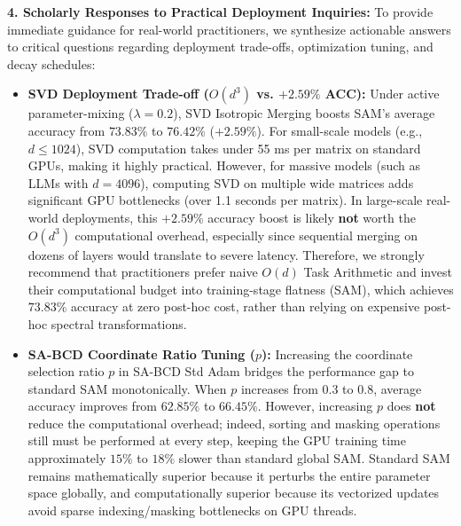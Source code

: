 \documentclass{article}
\theoremstyle{plain}
\theoremstyle{definition}
\theoremstyle{remark}
\begin{document}
\textbf{4. Scholarly Responses to Practical Deployment Inquiries:}
To provide immediate guidance for real-world practitioners, we synthesize actionable answers to critical questions regarding deployment trade-offs, optimization tuning, and decay schedules:
\begin{itemize}
  \item \textbf{SVD Deployment Trade-off ($O(d^3)$ vs. $+2.59\%$ ACC):} Under active parameter-mixing ($\lambda = 0.2$), SVD Isotropic Merging boosts SAM's average accuracy from $73.83\%$ to $76.42\%$ ($+2.59\%$). For small-scale models (e.g., $d \le 1024$), SVD computation takes under 55 ms per matrix on standard GPUs, making it highly practical. However, for massive models (such as LLMs with $d=4096$), computing SVD on multiple wide matrices adds significant GPU bottlenecks (over 1.1 seconds per matrix). In large-scale real-world deployments, this $+2.59\%$ accuracy boost is likely \textbf{not} worth the $O(d^3)$ computational overhead, especially since sequential merging on dozens of layers would translate to severe latency. Therefore, we strongly recommend that practitioners prefer naive $O(d)$ Task Arithmetic and invest their computational budget into training-stage flatness (SAM), which achieves $73.83\%$ accuracy at zero post-hoc cost, rather than relying on expensive post-hoc spectral transformations.
  \item \textbf{SA-BCD Coordinate Ratio Tuning ($p$):} Increasing the coordinate selection ratio $p$ in SA-BCD Std Adam bridges the performance gap to standard SAM monotonically. When $p$ increases from $0.3$ to $0.8$, average accuracy improves from $62.85\%$ to $66.45\%$. However, increasing $p$ does \textbf{not} reduce the computational overhead; indeed, sorting and masking operations still must be performed at every step, keeping the GPU training time approximately $15\%$ to $18\%$ slower than standard global SAM. Standard SAM remains mathematically superior because it perturbs the entire parameter space globally, and computationally superior because its vectorized updates avoid sparse indexing/masking bottlenecks on GPU threads.

\end{itemize}
\end{document}
